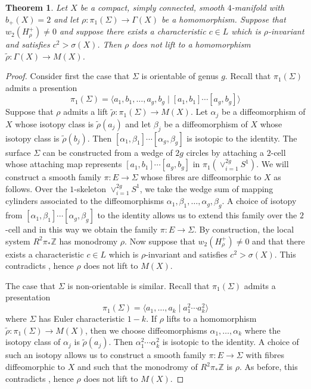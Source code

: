\documentclass{amsart}
\newtheorem{theorem}{Theorem}[section]
\theoremstyle{definition}
\theoremstyle{remark}
\numberwithin{equation}{section}
\begin{document}
\begin{theorem}\label{thm:nolift}
Let $X$ be a compact, simply connected, smooth $4$-manifold with $b_+(X)=2$ and let $\rho : \pi_1(\Sigma) \to \Gamma(X)$ be a homomorphism. Suppose that $w_2( H^+_{\rho}) \neq 0$ and suppose there exists a characteristic $c \in L$ which is $\rho$-invariant and satisfies $c^2 > \sigma(X)$. Then $\rho$ does not lift to a homomorphism $\widetilde{\rho} : \Gamma(X) \to M(X)$.
\end{theorem}
\begin{proof}
Consider first the case that $\Sigma$ is orientable of genus $g$. Recall that $\pi_1(\Sigma)$ admits a presention
\[
\pi_1(\Sigma) = \langle a_1,b_1, \dots , a_g,b_g \; | \; [a_1,b_1] \cdots [a_g,b_g] \rangle
\]
Suppose that $\rho$ admits a lift $\widetilde{\rho} : \pi_1(\Sigma) \to M(X)$. Let $\alpha_j$ be a diffeomorphism of $X$ whose isotopy class is $\widetilde{\rho}(a_j)$ and let $\beta_j$ be a diffeomorphism of $X$ whose isotopy class is $\widetilde{\rho}(b_j)$. Then $[\alpha_1,\beta_1] \cdots [\alpha_g,\beta_g]$ is isotopic to the identity. The surface $\Sigma$ can be constructed from a wedge of $2g$ circles by attaching a $2$-cell whose attaching map represents $[a_1,b_1] \cdots [a_g ,b_g]$ in $\pi_1( \vee_{i=1}^{2g} S^1)$. We will construct a smooth family $\pi : E \to \Sigma$ whose fibres are diffeomorphic to $X$ as follows. Over the $1$-skeleton $\vee_{i=1}^{2g} S^1$, we take the wedge sum of mapping cylinders associated to the diffeomorphisms $\alpha_1 , \beta_1 , \dots , \alpha_g , \beta_g$. A choice of isotopy from $[\alpha_1 , \beta_1] \cdots [\alpha_g , \beta_g]$ to the identity allows us to extend this family over the $2$-cell and in this way we obtain the family $\pi : E \to \Sigma$. By construction, the local system $R^2 \pi_* \mathbb{Z}$ has monodromy $\rho$. Now suppose that $w_2( H^+_{\rho}) \neq 0$ and that there exists a characteristic $c \in L$ which is $\rho$-invariant and satisfies $c^2 > \sigma(X)$. This contradicts \cite[Theorem 1.1]{bar1}, hence $\rho$ does not lift to $M(X)$.

The case that $\Sigma$ is non-orientable is similar. Recall that $\pi_1(\Sigma)$ admits a presentation
\[
\pi_1(\Sigma) = \langle a_1 , \dots , a_k \; | \; a_1^2 \cdots a_k^2 \rangle
\]
where $\Sigma$ has Euler characteristic $1-k$. If $\rho$ lifts to a homomorphism $\widetilde{\rho} : \pi_1(\Sigma) \to M(X)$, then we choose diffeomorphisms $\alpha_1 , \dots , \alpha_k$ where the isotopy class of $\alpha_j$ is $\widetilde{\rho}(a_j)$. Then $\alpha_1^2 \cdots \alpha_k^2$ is isotopic to the identity. A choice of such an isotopy allows us to construct a smooth family $\pi : E \to \Sigma$ with fibres diffeomorphic to $X$ and such that the monodromy of $R^2 \pi_* \mathbb{Z}$ is $\rho$. As before, this contradicts \cite[Theorem 1.1]{bar1}, hence $\rho$ does not lift to $M(X)$.
\end{proof} 
\end{document}
